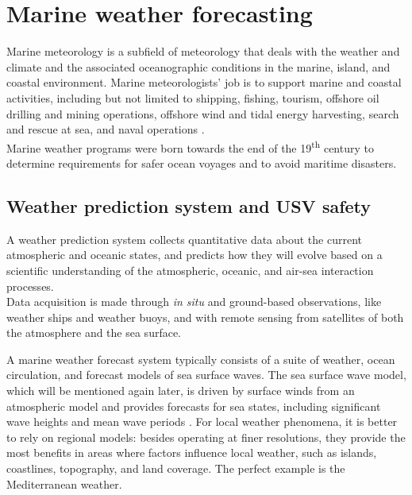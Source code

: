 \section{Marine weather forecasting}
Marine meteorology is a subfield of meteorology that deals with the weather and climate and the associated oceanographic conditions in the marine, island, and coastal environment.
Marine meteorologists' job is to support marine and coastal activities, including but not limited to shipping, fishing, tourism, offshore oil drilling and mining operations, offshore wind and tidal energy harvesting, search and rescue at sea, and naval operations \cite{XIE2015287}. \\
Marine weather programs were born towards the end of the 19\textsuperscript{th} century to determine requirements for safer ocean voyages and to avoid maritime disasters.
\newpage
\subsection{Weather prediction system and USV safety}
A weather prediction system collects quantitative data about the current atmospheric and oceanic states, and predicts how they will evolve based on a scientific understanding of the atmospheric, oceanic, and air-sea interaction processes.\\
Data acquisition is made through \textit{in situ} and ground-based observations, like weather ships and weather buoys, and with remote sensing from satellites of both the atmosphere and the sea surface.

A marine weather forecast system typically consists of a suite of weather, ocean circulation, and forecast models of sea surface waves. The sea surface wave model, which will be mentioned again later, is driven by surface winds from an atmospheric model and provides forecasts for sea states, including significant wave heights and mean wave periods \cite{XIE2015287}. For local weather phenomena, it is better to rely on regional models: besides operating at finer resolutions, they provide the most benefits in areas where factors influence local weather, such as islands, coastlines, topography, and land coverage. The perfect example is the Mediterranean weather.

